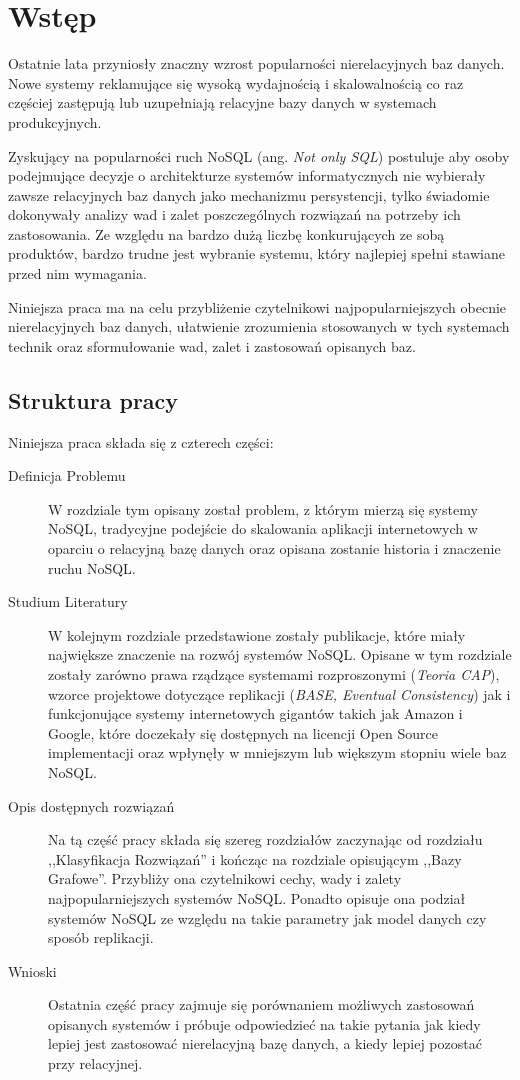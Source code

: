 \chapter{Wstęp}

Ostatnie lata przyniosły znaczny wzrost popularności nierelacyjnych baz danych.
Nowe systemy reklamujące się wysoką wydajnością i skalowalnością co raz częściej zastępują lub uzupełniają relacyjne bazy danych w systemach produkcyjnych.

Zyskujący na popularności ruch NoSQL (ang. \emph{Not only SQL}) postuluje aby osoby podejmujące decyzje o architekturze systemów informatycznych nie wybierały zawsze relacyjnych baz danych jako mechanizmu persystencji, tylko świadomie dokonywały analizy wad i zalet poszczególnych rozwiązań na potrzeby ich zastosowania.
Ze względu na bardzo dużą liczbę konkurujących ze sobą produktów, bardzo trudne jest wybranie systemu, który najlepiej spełni stawiane przed nim wymagania.

Niniejsza praca ma na celu przybliżenie czytelnikowi najpopularniejszych obecnie nierelacyjnych baz danych, ułatwienie zrozumienia stosowanych w tych systemach technik oraz sformułowanie wad, zalet i zastosowań opisanych baz.

\section{Struktura pracy}

Niniejsza praca składa się z czterech części:

\begin{description}
 \item[Definicja Problemu]
 W rozdziale tym opisany został problem, z którym mierzą się systemy NoSQL, tradycyjne podejście do skalowania aplikacji internetowych w oparciu o relacyjną bazę danych oraz opisana zostanie historia i znaczenie ruchu NoSQL.
 \item[Studium Literatury]
 W kolejnym rozdziale przedstawione zostały publikacje, które miały największe znaczenie na rozwój systemów NoSQL.
 Opisane w tym rozdziale zostały zarówno prawa rządzące systemami rozproszonymi (\emph{Teoria CAP}), wzorce projektowe dotyczące replikacji (\emph{BASE, Eventual Consistency}) jak i funkcjonujące systemy internetowych gigantów takich jak Amazon i Google, które doczekały się dostępnych na licencji Open Source implementacji oraz wpłynęły w mniejszym lub większym stopniu wiele baz NoSQL.
 \item[Opis dostępnych rozwiązań]
 Na tą część pracy składa się szereg rozdziałów zaczynając od rozdziału ,,Klasyfikacja Rozwiązań'' i kończąc na rozdziale opisującym ,,Bazy Grafowe''.
 Przybliży ona czytelnikowi cechy, wady i zalety najpopularniejszych systemów NoSQL.
 Ponadto opisuje ona podział systemów NoSQL ze względu na takie parametry jak model danych czy sposób replikacji.
 \item[Wnioski]
 Ostatnia część pracy zajmuje się porównaniem możliwych zastosowań opisanych systemów i próbuje odpowiedzieć na takie pytania jak kiedy lepiej jest zastosować nierelacyjną bazę danych, a kiedy lepiej pozostać przy relacyjnej.
\end{description}

